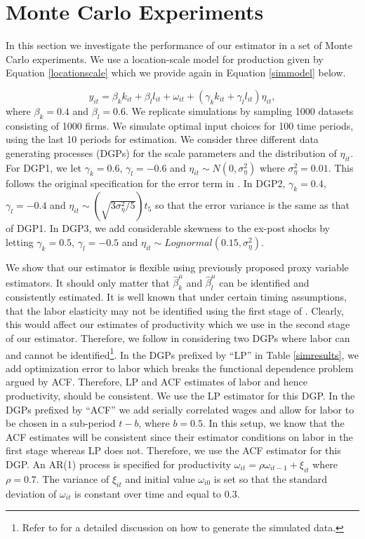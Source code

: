 \documentclass[11pt]{article}
\begin{document}
\section{Monte Carlo Experiments} \label{montecarlo}
In this section we investigate the performance of our estimator in a set of Monte Carlo experiments. We use a location-scale model for production given by Equation \eqref{locationscale} which we provide again in Equation \eqref{simmodel} below.

\begin{equation} \label{simmodel}
y_{it}=\beta_{k}k_{it}+\beta_{l}l_{it}+\omega_{it}+(\gamma_{k}k_{it}+\gamma_{l}l_{it})\eta_{it},
\end{equation}
where $\beta_{k}=0.4$ and $\beta_{l}=0.6$. We replicate \cite{Ackerberg2015} simulations by sampling 1000 datasets consisting of 1000 firms. We simulate optimal input choices for 100 time periods, using the last 10 periods for estimation. We consider three different data generating processes (DGPs) for the scale parameters and the distribution of $\eta_{it}$. For DGP1, we let $\gamma_{k}=0.6$, $\gamma_{l}=-0.6$ and $\eta_{it}\sim N(0,\sigma_{\eta}^{2})$ where $\sigma_{\eta}^{2}=0.01$. This follows the original specification for the error term in \cite{Ackerberg2015}. In DGP2, $\gamma_{k}=0.4$, $\gamma_{l}=-0.4$ and $\eta_{it}\sim (\sqrt{3\sigma_{\eta}^{2}/5})t_{5}$ so that the error variance is the same as that of DGP1. In DGP3, we add considerable skewness to the ex-post shocks by letting $\gamma_{k}=0.5$, $\gamma_{l}=-0.5$ and $\eta_{it}\sim Lognormal(0.15,\sigma_{\eta}^{2})$. 

We show that our estimator is flexible using previously proposed proxy variable estimators. It should only matter that $\hat{\beta}_{k}^{\mu}$ and $\hat{\beta}_{l}^{\mu}$ can be identified and consistently estimated. It is well known that under certain timing assumptions, that the labor elasticity may not be identified using the first stage of \cite{Levinsohn2003}. Clearly, this would affect our estimates of productivity which we use in the second stage of our estimator. Therefore, we follow \cite{Ackerberg2015} in considering two DGPs where labor can and cannot be identified\footnote{Refer to \cite{Ackerberg2015} for a detailed discussion on how to generate the simulated data.}. In the DGPs prefixed by ``LP'' in Table \ref{simresults}, we add optimization error to labor which breaks the functional dependence problem argued by ACF. Therefore, LP and ACF estimates of labor and hence productivity, should be consistent. We use the LP estimator for this DGP. In the DGPs prefixed by ``ACF'' we add serially correlated wages and allow for labor to be chosen in a sub-period $t-b$, where $b=0.5$. In this setup, we know that the ACF estimates will be consistent since their estimator conditions on labor in the first stage whereas LP does not. Therefore, we use the ACF estimator for this DGP. An AR(1) process is specified for productivity $\omega_{it}=\rho\omega_{it-1}+\xi_{it}$ where $\rho=0.7$. The variance of $\xi_{it}$ and initial value $\omega_{i0}$ is set so that the standard deviation of $\omega_{it}$ is constant over time and equal to $0.3$. 
\end{document}
